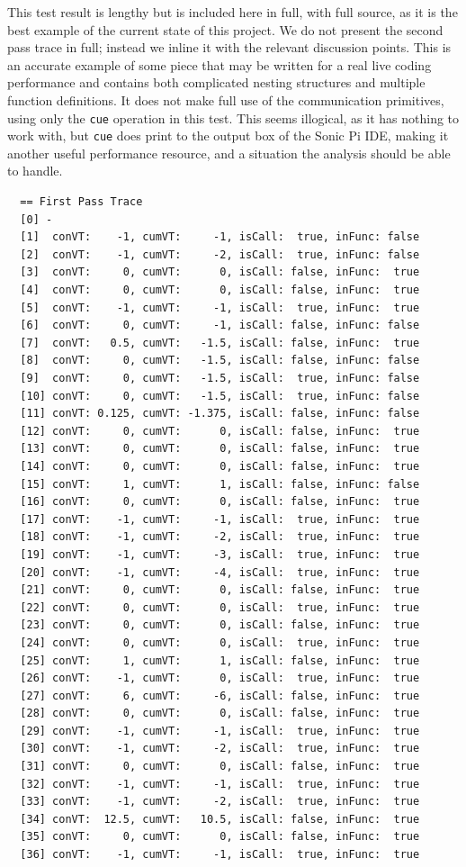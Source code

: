 \documentclass[11pt, abstracton, twoside, titlepage=true]{scrartcl}
\begin{document}
This test result is lengthy but is included here in full, with full source, as it 
is the best example of the current state of this project. We do not present the second 
pass trace in full; instead we inline it with the relevant discussion points. 
This is an accurate example of some piece that may be written for a real live coding 
performance and contains both complicated nesting structures and multiple function 
definitions. It does not make full use of the communication primitives, using only 
the \texttt{cue} operation in this test. This seems illogical, as it has nothing to 
work with, but \texttt{cue} does print to the output box of the Sonic Pi IDE, making 
it another useful performance resource, and a situation the analysis should be able 
to handle.
\\
\begin{lstlisting}
  == First Pass Trace
  [0] -
  [1]  conVT:    -1, cumVT:     -1, isCall:  true, inFunc: false
  [2]  conVT:    -1, cumVT:     -2, isCall:  true, inFunc: false
  [3]  conVT:     0, cumVT:      0, isCall: false, inFunc:  true
  [4]  conVT:     0, cumVT:      0, isCall: false, inFunc:  true
  [5]  conVT:    -1, cumVT:     -1, isCall:  true, inFunc:  true
  [6]  conVT:     0, cumVT:     -1, isCall: false, inFunc: false
  [7]  conVT:   0.5, cumVT:   -1.5, isCall: false, inFunc:  true
  [8]  conVT:     0, cumVT:   -1.5, isCall: false, inFunc: false
  [9]  conVT:     0, cumVT:   -1.5, isCall:  true, inFunc: false
  [10] conVT:     0, cumVT:   -1.5, isCall:  true, inFunc: false
  [11] conVT: 0.125, cumVT: -1.375, isCall: false, inFunc: false
  [12] conVT:     0, cumVT:      0, isCall: false, inFunc:  true
  [13] conVT:     0, cumVT:      0, isCall: false, inFunc:  true
  [14] conVT:     0, cumVT:      0, isCall: false, inFunc:  true
  [15] conVT:     1, cumVT:      1, isCall: false, inFunc: false
  [16] conVT:     0, cumVT:      0, isCall: false, inFunc:  true
  [17] conVT:    -1, cumVT:     -1, isCall:  true, inFunc:  true
  [18] conVT:    -1, cumVT:     -2, isCall:  true, inFunc:  true
  [19] conVT:    -1, cumVT:     -3, isCall:  true, inFunc:  true
  [20] conVT:    -1, cumVT:     -4, isCall:  true, inFunc:  true
  [21] conVT:     0, cumVT:      0, isCall: false, inFunc:  true
  [22] conVT:     0, cumVT:      0, isCall:  true, inFunc:  true
  [23] conVT:     0, cumVT:      0, isCall: false, inFunc:  true
  [24] conVT:     0, cumVT:      0, isCall:  true, inFunc:  true
  [25] conVT:     1, cumVT:      1, isCall: false, inFunc:  true
  [26] conVT:    -1, cumVT:      0, isCall:  true, inFunc:  true
  [27] conVT:     6, cumVT:     -6, isCall: false, inFunc:  true
  [28] conVT:     0, cumVT:      0, isCall: false, inFunc:  true
  [29] conVT:    -1, cumVT:     -1, isCall:  true, inFunc:  true
  [30] conVT:    -1, cumVT:     -2, isCall:  true, inFunc:  true
  [31] conVT:     0, cumVT:      0, isCall: false, inFunc:  true
  [32] conVT:    -1, cumVT:     -1, isCall:  true, inFunc:  true
  [33] conVT:    -1, cumVT:     -2, isCall:  true, inFunc:  true
  [34] conVT:  12.5, cumVT:   10.5, isCall: false, inFunc:  true
  [35] conVT:     0, cumVT:      0, isCall: false, inFunc:  true
  [36] conVT:    -1, cumVT:     -1, isCall:  true, inFunc:  true


\end{lstlisting}
\end{document}
